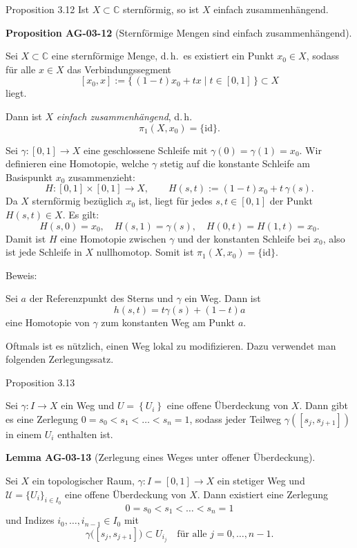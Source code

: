 \documentclass[10pt, letterpaper]{article}
\newcommand{\CustomHeading}[3]{%
  \par\medskip\noindent%
  \textbf{#1 #2} \textnormal{(#3)}.\enskip%
}
\newenvironment{PROP}[2]{\begin{unitbox}\CustomHeading{Proposition}{#1}{#2}}{\end{unitbox}}
\newenvironment{LEM}[2]{\begin{unitbox}\CustomHeading{Lemma}{#1}{#2}}{\end{unitbox}}
\begin{document}
Proposition 3.12 Ist $X \subset \mathbb{C}$ sternförmig, so ist $X$ einfach zusammenhängend.


\begin{PROP}{AG-03-12}{Sternförmige Mengen sind einfach zusammenhängend}
Sei \(X \subset \mathbb{C}\) eine sternförmige Menge, d.\,h.\ es existiert ein Punkt \(x_0 \in X\), sodass  
für alle \(x \in X\) das Verbindungssegment
\[
[x_0,x]:=\{\, (1-t)x_0 + t x \mid t \in [0,1] \,\}
\subset X
\]
liegt.

Dann ist \(X\) \emph{einfach zusammenhängend}, d.\,h.
\[
\pi_1(X,x_0)=\{\mathrm{id}\}.
\]
\end{PROP}


Sei \(\gamma:[0,1]\to X\) eine geschlossene Schleife mit \(\gamma(0)=\gamma(1)=x_0\).
Wir definieren eine Homotopie, welche \(\gamma\) stetig auf die konstante Schleife am Basispunkt \(x_0\) zusammenzieht:
\[
H:[0,1]\times[0,1]\to X,\qquad H(s,t) := (1-t)x_0 + t\,\gamma(s).
\]
Da \(X\) sternförmig bezüglich \(x_0\) ist, liegt für jedes \(s,t\in[0,1]\) der Punkt \(H(s,t)\in X\).
Es gilt:
\[
H(s,0)=x_0,\quad H(s,1)=\gamma(s),\quad
H(0,t)=H(1,t)=x_0.
\]
Damit ist \(H\) eine Homotopie zwischen \(\gamma\) und der konstanten Schleife bei \(x_0\),
also ist jede Schleife in \(X\) nullhomotop.
Somit ist \(\pi_1(X,x_0)=\{\mathrm{id}\}\).



Beweis: 

Sei $a$ der Referenzpunkt des Sterns und $\gamma$ ein Weg. Dann ist
$$
h(s, t)=t \gamma(s)+(1-t) a
$$
eine Homotopie von $\gamma$ zum konstanten Weg am Punkt $a$. 




Oftmals ist es nützlich, einen Weg lokal zu modifizieren. Dazu verwendet man folgenden Zerlegungssatz.


Proposition 3.13 

Sei $\gamma: I \rightarrow X$ ein Weg und $U=\left\{U_{i}\right\}$ eine offene Überdeckung von $X$. Dann gibt es eine Zerlegung $0=s_{0}<s_{1}<\ldots<s_{n}=1$, sodass jeder Teilweg $\gamma\left(\left[s_{j}, s_{j+1}\right]\right)$ in einem $U_{i}$ enthalten ist.

\begin{LEM}{AG-03-13}{Zerlegung eines Weges unter offener Überdeckung}
Sei \(X\) ein topologischer Raum, \(\gamma:I=[0,1]\to X\) ein stetiger Weg und
\(\mathcal U=\{U_i\}_{i\in I_0}\) eine offene Überdeckung von \(X\).
Dann existiert eine Zerlegung
\[
0=s_0<s_1<\dots<s_n=1
\]
und Indizes \(i_0,\dots,i_{n-1}\in I_0\) mit
\[
\gamma\big([s_j,s_{j+1}]\big)\subset U_{i_j}\quad\text{für alle }j=0,\dots,n-1.
\]
\end{LEM}
\end{document}
